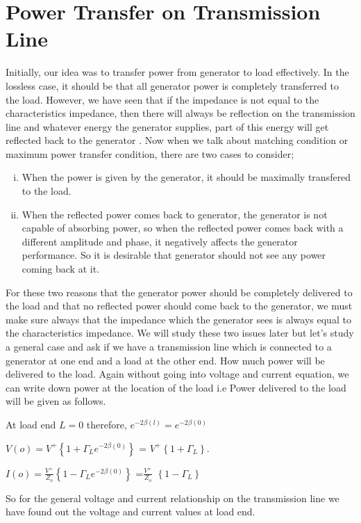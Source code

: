 \section{Power Transfer on Transmission Line}
Initially, our idea was to transfer power from generator to load effectively. In the lossless case, it should be that all generator power is completely transferred to the load. However, we have seen that if the impedance is not equal to the characteristics impedance, then there will always be reflection on the transmission line and whatever energy the generator supplies, part of this energy will get reflected back to the generator . Now when we talk about matching condition or maximum power transfer condition, there are two cases to consider;
\begin{enumerate}[(i)]
\item When the power is given by the generator, it should be maximally transfered to the load.
\item When the reflected power comes back to generator, the generator is not capable of absorbing power, so when the reflected power comes back with a different amplitude and phase, it negatively affects the generator performance. So it is desirable that generator should not see any power coming back at it.
\end{enumerate}
For these two reasons that the generator power should be completely delivered to the load and that no reflected power should come back to the generator, we must make sure always that the impedance which the generator sees is always equal to the characteristics impedance. We will study these two issues later but let's study a general case and ask if we have a transmission line which is connected to a generator at  one end and a load at the other end. How much power will be delivered to the load. Again without going into voltage and current equation, we can write down power at the location of the load i.e Power delivered to the load will be given as follows.

At load end $L=0$ therefore, $e^{-2\beta (l)} = e^{-2\beta (0)}$

$V(o)= V^{+} \left\lbrace {1 + \Gamma_L e^{-2\beta(0)}}\right\rbrace $ = $V^{+}\left\lbrace 1 +\Gamma_L \right\rbrace$.

$I(o)= \frac{V^{+}}{Z_o} \left\lbrace {1 - \Gamma_L e^{-2\beta(0)}}\right\rbrace $ =$ \frac{V^{+}}{Z_o}$ $\left\lbrace 1 -\Gamma_L \right\rbrace$ 

So for the general voltage and current relationship on the transmission line we have found  out the voltage and current values at load end.

